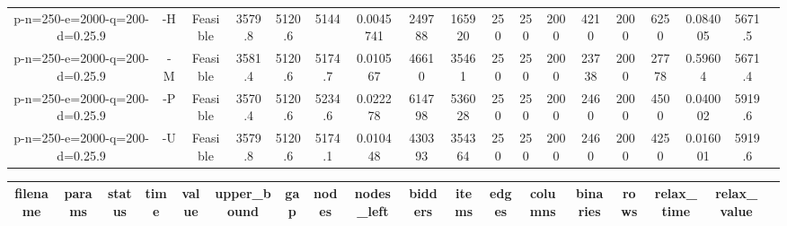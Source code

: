 \documentclass[landscape, a4paper]{article}
\begin{document}
\begin{center}
\begin{tabular}{@{}cccccccccccccccccc@{}}
p-n=250-e=2000-q=200-d=0.25.9 & -H & Feasible & 3579.8 & 5120.6 & 5144 & 0.0045741 & 249788 & 165920 & 250 & 250 & 2000 & 4210 & 2000 & 6250 & 0.084005 & 5671.5 & \\
p-n=250-e=2000-q=200-d=0.25.9 & -M & Feasible & 3581.4 & 5120.6 & 5174.7 & 0.010567 & 46610 & 35461 & 250 & 250 & 2000 & 23738 & 2000 & 27778 & 0.59604 & 5671.4 & \\
p-n=250-e=2000-q=200-d=0.25.9 & -P & Feasible & 3570.4 & 5120.6 & 5234.6 & 0.022278 & 614798 & 536028 & 250 & 250 & 2000 & 2460 & 2000 & 4500 & 0.040002 & 5919.6 & \\
p-n=250-e=2000-q=200-d=0.25.9 & -U & Feasible & 3579.8 & 5120.6 & 5174.1 & 0.010448 & 430393 & 354364 & 250 & 250 & 2000 & 2460 & 2000 & 4250 & 0.016001 & 5919.6 & \\
\end{tabular}
\end{center}
\begin{center}
\begin{tabular}{@{}cccccccccccccccccc@{}}
filename & params & status & time & value & upper\_bound & gap & nodes & nodes\_left & bidders & items & edges & columns & binaries & rows & relax\_time & relax\_value & \\
\hline
\end{tabular}
\end{center}
\end{document}
